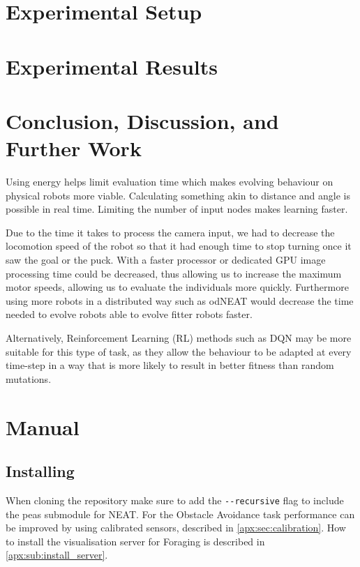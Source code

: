 \documentclass{article}
\begin{document}

	\section{Experimental Setup} %
	\label{sec:setup}


	\section{Experimental Results} %
	\label{sec:results}
	

	\section{Conclusion, Discussion, and Further Work} %
	\label{sec:conclusion}
	Using energy helps limit evaluation time which makes evolving behaviour on
	physical robots more viable.
	Calculating something akin to distance and angle is possible in real time.
	Limiting the number of input nodes makes learning faster. %

	Due to the time it takes to process the camera input, we had to decrease
	the locomotion speed of the robot so that it had enough time to stop
	turning once it saw the goal or the puck. With a faster processor or
	dedicated GPU image processing time could be decreased, thus allowing us to
	increase the maximum motor speeds, allowing us to evaluate the individuals
	more quickly.
	Furthermore using more robots in a distributed way such as
	odNEAT \cite{silva2012odneat} would decrease the time needed to evolve
	robots able to evolve fitter robots faster.

	Alternatively, Reinforcement Learning (RL) methods such as DQN
	\cite{mnih2013playing} may be more suitable for this type of task, as they
	allow the behaviour to be adapted at every time-step in a way that is more
	likely to result in better fitness than random mutations.

	\appendix
	\section{Manual} %
	\label{apx:sec:manual}
	\subsection{Installing} %
	\label{sub:installing}
	When cloning the repository make sure to add the \texttt{{-}{-}recursive}
	flag to include the peas submodule for NEAT.
	For the Obstacle Avoidance task performance can be improved by using
	calibrated sensors, described in \ref{apx:sec:calibration}. How to install
	the visualisation server for Foraging is described in
	\ref{apx:sub:install_server}.
\end{document}
